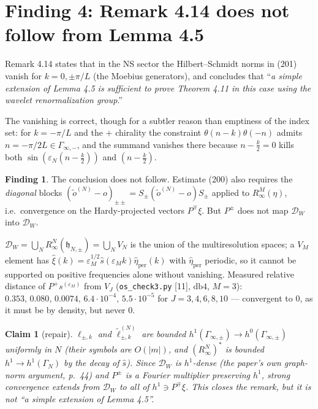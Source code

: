 \documentclass[11pt,a4paper]{article}
\newtheorem{claim}{Claim}
\theoremstyle{definition}
\newtheorem{finding}{Finding}
\newcommand{\eps}{\varepsilon}
\newcommand{\hs}{\mathfrak{h}}
\newcommand{\Gi}{\Gamma_{\!\infty,\pm}}
\newcommand{\DW}{\mathcal{D}_W}
\newcommand{\sh}{\hat{s}}
\begin{document}
\section{Finding 4: Remark 4.14 does not follow from Lemma 4.5}

\noindent
Remark 4.14 states that in the NS sector the Hilbert--Schmidt norms in (201) vanish for
$k=0,\pm\pi/L$ (the Moebius generators), and concludes that ``\emph{a simple extension of
Lemma 4.5 is sufficient to prove Theorem 4.11 in this case using the wavelet renormalization
group}.''

The vanishing is correct, though for a subtler reason than emptiness of the index set: for
$k=-\pi/L$ and the $+$ chirality the constraint $\theta(n-k)\theta(-n)$ admits
$n=-\pi/2L\in\Gamma_{\infty,-}$, and the summand vanishes there because $n-\tfrac k2=0$ kills
both $\sin(\eps_N(n-\tfrac k2))$ and $(n-\tfrac k2)$.

\begin{finding}
The conclusion does not follow. Estimate (200) also requires the \emph{diagonal} blocks
$(\tilde o^{(N)}-o)_{\pm\pm}=S_\pm(\tilde o^{(N)}-o)S_\pm$ applied to $R^M_\infty(\eta)$, i.e.\
convergence on the Hardy-projected vectors $P^\mp\xi$. But $P^\pm$ does not map $\DW$ into
$\DW$.
\end{finding}

\noindent
$\DW=\bigcup_NR^N_\infty(\hs_{N,\pm})=\bigcup_NV_N$ is the union of the multiresolution spaces;
a $V_M$ element has $\hat\xi(k)=\eps_M^{1/2}\sh(\eps_Mk)\hat\eta_{\mathrm{per}}(k)$ with
$\hat\eta_{\mathrm{per}}$ periodic, so it cannot be supported on positive frequencies alone
without vanishing. Measured relative distance of $P^+s^{(\eps_M)}$ from $V_J$
(\texttt{os\_check3.py} [11], $\mathrm{db}4$, $M=3$): $0.353,\,0.080,\,0.0074,\,6.4\cdot10^{-4},
\,5.5\cdot10^{-5}$ for $J=3,4,6,8,10$ --- convergent to $0$, as it must be by density, but never
$0$.

\begin{claim}[repair]
$\ell_{\pm,k}$ and $\tilde\ell^{(N)}_{\pm,k}$ are bounded $h^1(\Gi)\to h^0(\Gi)$ \emph{uniformly
in $N$} (their symbols are $O(|m|)$, and $(R^N_\infty)^*$ is bounded $h^1\to h^1(\Gamma_N)$ by
the decay of $\sh$). Since $\DW$ is $h^1$-dense (the paper's own graph-norm argument, p.~44)
and $P^\pm$ is a Fourier multiplier preserving $h^1$, strong convergence extends from $\DW$ to
all of $h^1\ni P^\mp\xi$. This closes the remark, but it is not ``a simple extension of Lemma 4.5''.
\end{claim}
\end{document}
